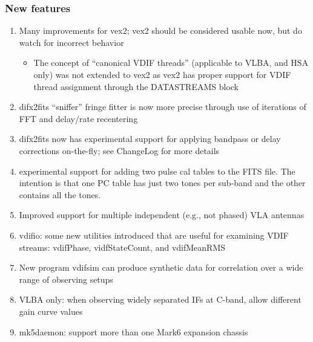 \subsubsection{New features}
\begin{enumerate}
\item Many improvements for vex2; vex2 should be considered usable now, but do watch for incorrect behavior
\begin{itemize}
  \item The concept of ``canonical VDIF threads'' (applicable to VLBA, and HSA only) was not extended to vex2 as vex2 has proper support for VDIF thread assignment through the DATASTREAMS block
\end{itemize}
\item difx2fits ``sniffer'' fringe fitter is now more precise through use of iterations of FFT and delay/rate recentering
\item difx2fits now has experimental support for applying bandpass or delay corrections on-the-fly; see ChangeLog for more details
\item experimental support for adding two pulse cal tables to the FITS file.  The intention is that one PC table has just two tones per sub-band and the other contains all the tones.
\item Improved support for multiple independent (e.g., not phased) VLA antennas
\item vdifio: some new utilities introduced that are useful for examining VDIF streams: vdifPhase, vidfStateCount, and vdifMeanRMS
\item New program vdifsim can produce synthetic data for correlation over a wide range of observing setups
\item VLBA only: when observing widely separated IFs at C-band, allow different gain curve values
\item mk5daemon: support more than one Mark6 expansion chassis
\end{enumerate}

